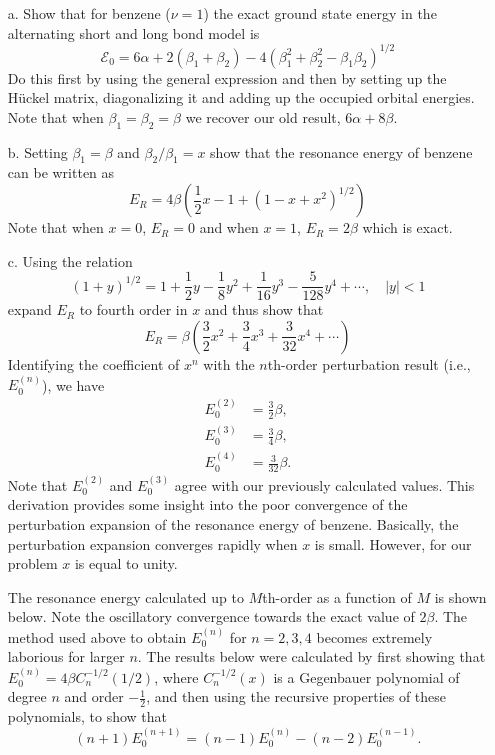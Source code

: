 \documentclass[a4paper]{book}
\newcounter{exercise}[chapter]
\begin{document}
\begin{exercise}
\begin{enumerate}
	\item[a.] Show that for benzene ($\nu=1$) the exact ground state energy in the alternating short and long bond model is
	\[
		\mathscr{E}_0 = 6 \alpha + 2(\beta_1 + \beta_2) - 4 ( \beta^2_1 + \beta^2_2 - \beta_1 \beta_2 )^{1/2}
	\]
	Do this first by using the general expression and then by setting up the H{\"u}ckel matrix, diagonalizing it and adding up the occupied orbital energies. Note that when $\beta_1=\beta_2=\beta$ we recover our old result, $6\alpha+8\beta$.
	
	\item[b.] Setting $\beta_1 = \beta$ and $\beta_2/\beta_1=x$ show that the resonance energy of benzene can be written as
	\[
		E_R = 4 \beta ( \frac{1}{2}x - 1 + (1-x+x^2)^{1/2})
	\]
	Note that when $x=0$, $E_R=0$ and when $x=1$, $E_R=2\beta$ which is exact.
	
	\item[c.] Using the relation
	\[
		(1 + y)^{1/2} = 1 + \frac{1}{2} y - \frac{1}{8}y^2 + \frac{1}{16} y^3 - \frac{5}{128}y^4 + \cdots , \quad |y|<1
	\]	
	expand $E_R$ to fourth order in $x$ and thus show that
	\[
		E_R = \beta ( \frac{3}{2}x^2 + \frac{3}{4} x^3 + \frac{3}{32}x^4 + \cdots )
	\]
	Identifying the coefficient of $x^n$ with the $n$th-order perturbation result (i.e., $E^{(n)}_0$), we have
	\begin{align*}
		E^{(2)}_0 &= \frac{3}{2} \beta, \\
		E^{(3)}_0 &= \frac{3}{4} \beta, \\
		E^{(4)}_0 &= \frac{3}{32} \beta.
	\end{align*}
	Note that $E^{(2)}_0$ and $E^{(3)}_0$ agree with our previously calculated values. This derivation provides some insight into the poor convergence of the perturbation expansion of the resonance energy of benzene. Basically, the perturbation expansion converges rapidly when $x$ is small. However, for our problem $x$ is equal to unity.
	
	The resonance energy calculated up to $M$th-order as a function of $M$ is shown below. Note the oscillatory convergence towards the exact value of $2\beta$. The method used above to obtain $E^{(n)}_0$ for $n=2,3,4$ becomes extremely laborious for larger $n$. The results below were calculated by first showing that $E^{(n)}_0 = 4\beta C^{-1/2}_n(1/2)$, where $C^{-1/2}_n(x)$ is a Gegenbauer polynomial of degree $n$ and order $-\frac{1}{2}$, and then using the recursive properties of these polynomials, to show that
	\[
		(n+1)E^{(n+1)}_0 = (n-1) E^{(n)}_0 - (n-2) E^{(n-1)}_0.
	\]
	

\end{enumerate}
\end{exercise}
\end{document}
